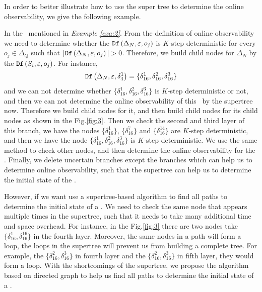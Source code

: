In order to better illustrate how to use the super tree to determine the online observability, we give the following example.
  
\begin{example}
In the \BCN\ mentioned in {\em Example \ref{exa:2}}. From the definition of online observability we need to determine whether the ${\tt Df}\left(\Delta_N,\varepsilon,o_j\right)$ is $K$-step deterministic for every  $o_j \in \Delta_Q$ such that $|\Ded\left(\Delta_N,\varepsilon, o_j\right)|> 0$. Therefore, we build child nodes for $\Delta_N$ by the ${\tt Df}\left(S_i,\varepsilon, o_j\right)$. For instance, \[{\tt Df}\left(\Delta_N,\varepsilon,\delta_{4}^1\right)=\{\delta_{16}^1,\delta_{16}^2,\delta_{16}^3\}\] and we can not determine whether $\{\delta_{16}^1,\delta_{16}^2,\delta_{16}^3\}$ is $K$-step deterministic or not, and then we can not determine the online observability of this \BCN\ by the supertree now. Therefore we build child nodes for it, and then build child nodes for its child nodes as shown in the Fig.\ref{fig:3}. Then we check the second and third layer of this branch, we have the nodes $\{\delta_{16}^1\}$, $\{\delta_{16}^7\}$ and $\{\delta_{16}^{14}\}$ are $K$-step deterministic, and then we have the node $\{\delta_{16}^1,\delta_{16}^2,\delta_{16}^3\}$ is $K$-step deterministic. We use the same method to check other nodes, and then determine the online observability for the \BCN. Finally, we delete uncertain branches except the branches which can help us to determine online observability, such that the supertree can help us to determine the initial state of the \BCN.%

\end{example}   

However, if we want use a supertree-based algorithm to find all paths to determine the initial state of a \BCN. We need to check the same node that appears multiple times in the supertree, such that it needs to take many additional time and space overhead. For instance, in the Fig.\ref{fig:3} there are two nodes take $\{\delta_{16}^1,\delta_{16}^{16}\}$ in the fourth layer. Moreover, the same nodes in a path will form a loop, the loops in the supertree will prevent us from building a complete tree. For example, the $\{\delta_{16}^2,\delta_{16}^3\}$ in fourth layer and the $\{\delta_{16}^2,\delta_{16}^3\}$ in fifth layer, they would form a loop. With the shortcomings of the supertree, we propose the algorithm based on directed graph to help us find all paths to determine the initial state of a \BCN.
